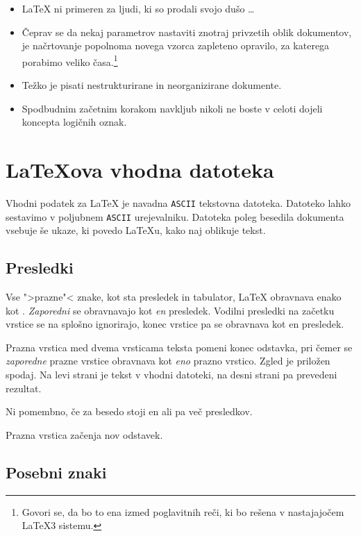 \begin{itemize}
\item \LaTeX{} ni primeren za ljudi, ki so prodali svojo dušo \ldots
\item Čeprav se da nekaj parametrov nastaviti znotraj privzetih 
  oblik dokumentov, je načrtovanje popolnoma novega vzorca 
  zapleteno opravilo, za katerega porabimo veliko časa.\footnote{Govori se, da bo to ena izmed poglavitnih
    reči, ki bo rešena v nastajajočem \LaTeX 3 sistemu.}
\item Težko je pisati nestrukturirane in neorganizirane dokumente.
\item Spodbudnim začetnim korakom navkljub nikoli ne boste v celoti dojeli 
   koncepta logičnih oznak.
\end{itemize}
 
\section{\LaTeX{}ova vhodna datoteka}

Vhodni podatek za \LaTeX{} je navadna \texttt{ASCII} tekstovna datoteka. Datoteko lahko
sestavimo v poljubnem \texttt{ASCII} urejevalniku. Datoteka poleg besedila dokumenta vsebuje 
še ukaze, ki povedo \LaTeX{}u, kako naj oblikuje tekst.

\subsection{Presledki}

Vse ">prazne"< znake, kot sta presledek in tabulator, \LaTeX{} obravnava enako kot 
. \emph{Zaporedni}  se obravnavajo
 kot \emph{en}
presledek. Vodilni presledki na začetku vrstice se na splošno ignorirajo,
konec vrstice pa se obravnava kot en presledek.

Prazna vrstica med dvema vrsticama teksta pomeni konec odstavka, pri čemer
se \emph{zaporedne} prazne vrstice obravnava kot 
\emph{eno} prazno vrstico. Zgled je priložen spodaj. Na levi strani je tekst 
v vhodni datoteki, na desni strani pa prevedeni rezultat.

\begin{example}
Ni pomembno, če za besedo 
stoji en ali pa več   presledkov.

Prazna vrstica začenja nov 
odstavek.
\end{example}


\subsection{Posebni znaki}

